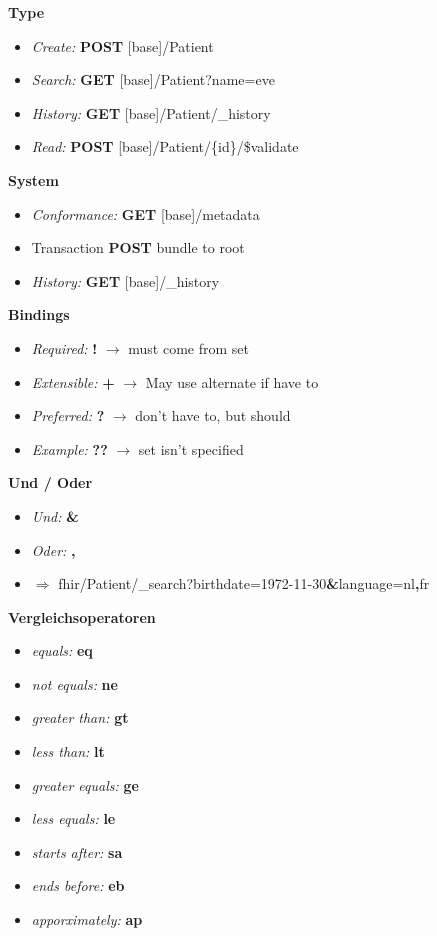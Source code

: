 \documentclass{report}
\theoremstyle{definition}
\theoremstyle{example}
\begin{document}
\textbf{Type}
\begin{itemize}
   \item \textit{Create:} \textbf{POST} [base]/Patient
   \item \textit{Search:} \textbf{GET} [base]/Patient?name=eve
   \item \textit{History:} \textbf{GET} [base]/Patient/\_history
   \item \textit{Read:} \textbf{POST} [base]/Patient/\{id\}/\$validate
\end{itemize}

\textbf{System}
\begin{itemize}
   \item \textit{Conformance:} \textbf{GET} [base]/metadata
   \item Transaction \textbf{POST} bundle to root
   \item \textit{History:} \textbf{GET} [base]/\_history
\end{itemize}

\textbf{Bindings}
\begin{itemize}
   \item \textit{Required:} \textbf{!} $\rightarrow$ must come from set
   \item \textit{Extensible:} \textbf{+} $\rightarrow$ May use alternate if have to
   \item \textit{Preferred:} \textbf{?} $\rightarrow$ don't have to, but should
   \item \textit{Example:} \textbf{??} $\rightarrow$ set isn't specified
\end{itemize}

\textbf{Und / Oder}
\begin{itemize}
   \item \textit{Und:} \textbf{\&}
   \item \textit{Oder:} \textbf{,}
   \item $\Rightarrow$ fhir/Patient/\_search?birthdate=1972-11-30\textbf{\&}language=nl\textbf{,}fr
\end{itemize}

\textbf{Vergleichsoperatoren}
\begin{itemize}
   \item \textit{equals:} \textbf{eq}
   \item \textit{not equals:} \textbf{ne}
   \item \textit{greater than:} \textbf{gt}
   \item \textit{less than:} \textbf{lt}
   \item \textit{greater equals:} \textbf{ge}
   \item \textit{less equals:} \textbf{le}
   \item \textit{starts after:} \textbf{sa}
   \item \textit{ends before:} \textbf{eb}
   \item \textit{apporximately:} \textbf{ap}
\end{itemize}
\end{document}
